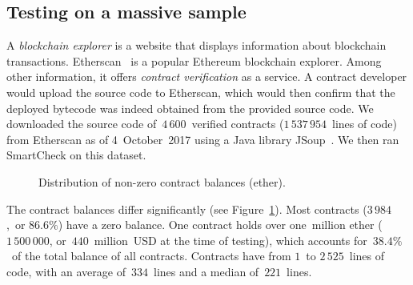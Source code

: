 \subsection{Testing on a massive sample} \label{MassiveTesting}

A \textit{blockchain explorer} is a website that displays information about blockchain transactions.
Etherscan~\cite{EtherscanVerified} is a popular Ethereum blockchain explorer.
Among other information, it offers \textit{contract verification} as a service.
A contract developer would upload the source code to Etherscan, which would then confirm that the deployed bytecode was indeed obtained from the provided source code.
We downloaded the source code of~$4\,600$~verified contracts ($1\,537\,954$~lines of code) from Etherscan as of 4~October~2017 using a Java library JSoup~\cite{JSoup}.
We then ran SmartCheck on this dataset.

\begin{figure}
	\centering
	\caption{Distribution of non-zero contract balances (ether).}
	\label{BalancesFigure}
\end{figure}

The contract balances differ significantly (see Figure~\ref{BalancesFigure}).
Most contracts ($3\,984$,~or $86.6\%$) have a zero balance.
One contract holds over one~million ether ($1\,500\,000$, or~$440$~million~USD at the time of testing), which accounts for~$38.4\%$~of the total balance of all contracts.
Contracts have from $1$~to $2\,525$~lines of code, with an average of~$334$~lines and a median of~$221$~lines.

